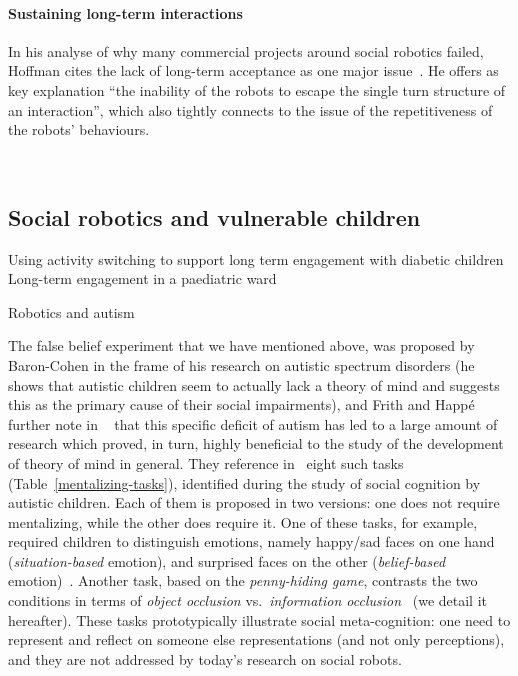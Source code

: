 \documentclass[11pt,a4paper]{report}
\begin{document}
\paragraph{Sustaining long-term interactions}

In his analyse of why many commercial projects around social robotics failed,
Hoffman cites the lack of long-term acceptance as one major
issue~\cite{hoffman2019anki}. He offers as key explanation ``the inability of
the robots to escape the single turn structure of an interaction'', which also
tightly connects to the issue of the repetitiveness of the robots' behaviours.

~\cite{dereshev2019longterm}

\subsection{Social robotics and vulnerable children}

Using activity switching to support long term engagement with diabetic children~\cite{coninx2016towards}
Long-term engagement in a paediatric ward~\cite{baxter2011long}

Robotics and autism~\cite{pennisi2016autism}

The false belief experiment that we have mentioned above, was proposed by
Baron-Cohen in the frame of his research on autistic spectrum disorders (he
shows that autistic children seem to actually lack a theory of mind and suggests
this as the primary cause of their social impairments), and Frith and Happé
further note in ~\cite{frith1994autism} that this specific deficit of autism has
led to a large amount of research which proved, in turn, highly beneficial to
the study of the development of theory of mind in general. They reference
in~\cite{frith1994autism} eight such tasks (Table~\ref{mentalizing-tasks}),
identified during the study of social cognition by autistic children. Each of
them is proposed in two versions: one does not require mentalizing, while the
other does require it.  One of these tasks, for example, required children to
distinguish emotions, namely happy/sad faces on one hand (\emph{situation-based}
emotion), and surprised faces on the other (\emph{belief-based}
emotion)~\cite{baron1993children}.  Another task, based on the
\emph{penny-hiding game}, contrasts the two conditions in terms of \emph{object
occlusion} vs.~\emph{information occlusion}~\cite{baron1992out} (we detail it
hereafter). These tasks prototypically illustrate social meta-cognition: one
need to represent and reflect on someone else representations (and not only
perceptions), and they are not addressed by today's research on social robots.
\end{document}
